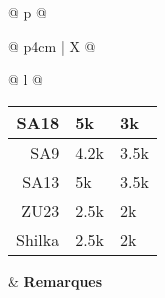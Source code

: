 \begin{adjustbox}{width={\textwidth},totalheight={\textheight}}
{\begin{tabularx}{\textwidth}{ @{} p{\linewidth} @{} }
{\begin{tabularx}{\textwidth}{@{} p{4cm} | X @{}}
\begin{tabular}[t]{@{} l @{}}
{\begin{tabularx}{\linewidth}{@{} r X X @{}}
				SA18 & 5k & 3k\\[-3ex] \midrule
				SA9 & 4.2k & 3.5k\\[-3ex] \midrule
				SA13 & 5k & 3.5k\\[-3ex] \midrule
				ZU23 & 2.5k & 2k\\[-3ex] \midrule
				Shilka & 2.5k & 2k\\[-3ex] \midrule
			\end{tabularx}}
		\end{tabular} &
		\textbf{Remarques}\\
	\end{tabularx}}\\
\end{tabularx}
}
\end{adjustbox}%